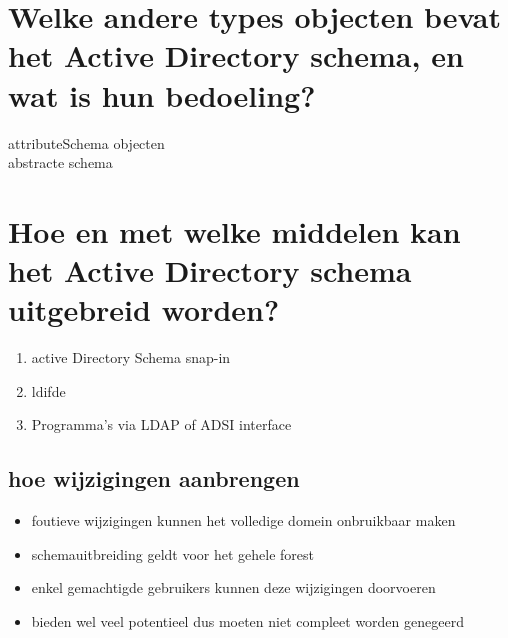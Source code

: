 \section{Welke andere types objecten bevat het Active Directory schema, en wat
is hun bedoeling?}

\begin{description}
	\item[attributeSchema objecten]
	\item[abstracte schema]
\end{description}

\section{Hoe en met welke middelen kan het Active Directory schema uitgebreid
worden?}

\begin{enumerate}
	\item active Directory Schema snap-in
	\item ldifde
	\item Programma's via LDAP of ADSI interface
\end{enumerate}

\subsection{hoe wijzigingen aanbrengen}

\begin{itemize}
	\item foutieve wijzigingen kunnen het volledige domein onbruikbaar maken
	\item schemauitbreiding geldt voor het gehele forest
	\item enkel gemachtigde gebruikers kunnen deze wijzigingen doorvoeren
	\item bieden wel veel potentieel dus moeten niet compleet worden genegeerd
\end{itemize}
